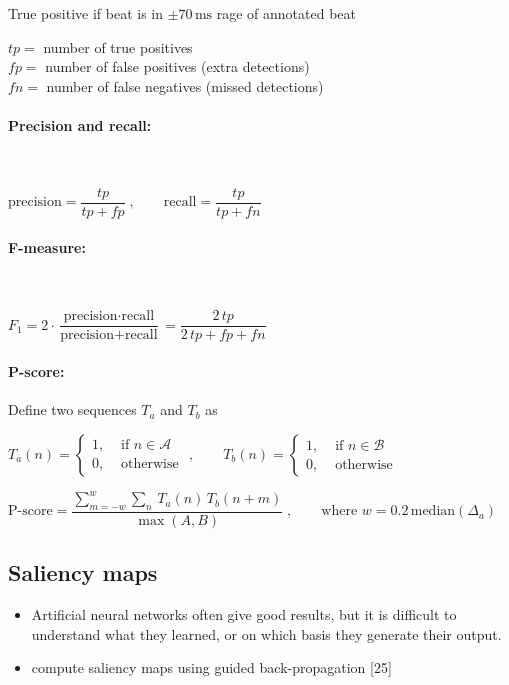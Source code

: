 \documentclass{scrartcl}
\begin{document}
True positive if beat is in $\pm 70\,\text{ms}$ rage of annotated beat

$tp =$ number of true positives \\
$fp =$ number of false positives (extra detections) \\
$fn =$ number of false negatives (missed detections) 

\paragraph{Precision and recall:} $ $

$\text{precision} = \dfrac{tp}{tp + fp}\;, \qquad \text{recall} = \dfrac{tp}{tp + fn}$


\paragraph{F-measure:} $ $

$F_1 = 2 \cdot \dfrac{\text{precision} \cdot \text{recall}}{\text{precision} + \text{recall}} = \dfrac{2\, tp}{2\, tp + fp + fn}$

\paragraph{P-score:} Define two sequences $T_a$ and $T_b$ as 

$T_a(n) = \begin{cases}
	1, &\text{ if } n \in \mathcal A \\
	0 , & \text{ otherwise }
\end{cases}, \qquad T_b(n) = \begin{cases}
	1, &\text{ if } n \in \mathcal B \\
	0 , & \text{ otherwise }
\end{cases}$

$\text{P-score} = \dfrac{\displaystyle \sum_{m=-w}^w  \sum_{n}\,  T_a(n)\,  T_b(n+m)}{\max(A,B)} \;, \qquad \text{where } w = 0.2 \, \text{median}(\Delta_a)$ 



\subsection{Saliency maps}

\begin{itemize}
\item Artificial neural networks often give good results, but it is difficult to understand what they learned, or on which basis they generate their output.
\item compute saliency maps using guided back-propagation [25]
\end{itemize}
\end{document}
